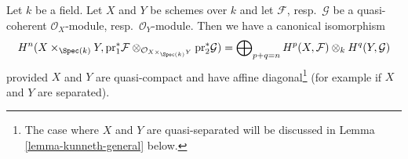 %
\begin{lemma}
\label{lemma-kunneth}
Let $k$ be a field. Let $X$ and $Y$ be schemes over $k$ and
let $\mathcal{F}$, resp.\ $\mathcal{G}$ be a quasi-coherent
$\mathcal{O}_X$-module, resp.\ $\mathcal{O}_Y$-module.
Then we have a canonical isomorphism
$$
H^n(X \times_{\Spec(k)} Y, \text{pr}_1^*\mathcal{F}
\otimes_{\mathcal{O}_{X \times_{\Spec(k)} Y}} \text{pr}_2^*\mathcal{G}) =
\bigoplus\nolimits_{p + q = n}
H^p(X, \mathcal{F}) \otimes_k H^q(Y, \mathcal{G})
$$
provided $X$ and $Y$ are quasi-compact and have affine
diagonal\footnote{The case where $X$ and $Y$ are quasi-separated
will be discussed in Lemma \ref{lemma-kunneth-general} below.}
(for example if $X$ and $Y$ are separated).
\end{lemma}

